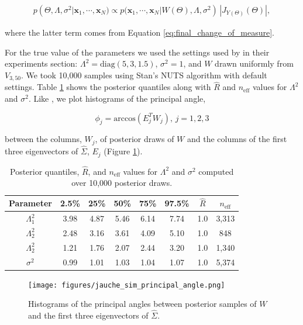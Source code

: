 \documentclass[ba]{imsart}
\newcommand{\mb}[1]{\mathbf{#1}}
\numberwithin{equation}{section}
\theoremstyle{plain}
\begin{document}
\begin{eqnarray}
\label{eq:ppca_density_givens}
p(\Theta, \Lambda, \sigma^2 | \mb{x}_1, \cdots, \mb{x}_N) \propto p(\mb{x}_1, \cdots, \mb{x}_N | W(\Theta), \Lambda, \sigma^2)\, |J_{Y(\Theta)}(\Theta)|,
\end{eqnarray}

\noindent where the latter term comes from Equation \ref{eq:final_change_of_measure}.

\noindent For the true value of the parameters we used the settings used by \citet{jauch2018random} in their experiments section: $\Lambda^2 = \mathrm{diag}(5, 3, 1.5)$, $\sigma^2 = 1$, and $W$ drawn uniformly from $V_{3, 50}$. We took 10,000 samples using Stan's NUTS algorithm with default settings. Table \ref{tab:ppca50} shows the posterior quantiles along with $\hat{R}$ and $n_{\mathrm{eff}}$ values for $\Lambda^2$ and $\sigma^2$. Like \citet{jauch2018random}, we plot histograms of the principal angle,

\begin{equation}
\phi_j = \mathrm{arccos}(E_j^T W_j),\, j=1,2,3
\end{equation}

\noindent between the columns, $W_j$, of posterior draws of $W$ and the columns of the first three eigenvectors of $\hat{\Sigma}$, $E_j$ (Figure \ref{fig:ppca50_principal_angle}).

\begin{table}
\begin{tabular}{|c||ccccccc|}
\hline
Parameter & 2.5\% & 25\% & 50\% & 75\% & 97.5\% &  $\hat{R}$ & $n_{\mathrm{eff}}$\\
\hline
\hline
$\Lambda_1^2$  & 3.98 & 4.87 & 5.46 & 6.14 & 7.74 & 1.0 & 3,313\\
$\Lambda_2^2$  & 2.48 & 3.16 & 3.61 & 4.09 & 5.10 & 1.0 & 848\\
$\Lambda_2^2$  & 1.21 & 1.76 & 2.07 & 2.44 & 3.20 & 1.0 & 1,340 \\
$\sigma^2$ & 0.99 & 1.01 & 1.03 & 1.04 & 1.07 & 1.0 & 5,374\\
\hline
\end{tabular}
\caption{Posterior quantiles, $\hat{R}$, and $n_{\mathrm{eff}}$ values for $\Lambda^2$ and $\sigma^2$ computed over 10,000 posterior draws.}
\label{tab:ppca50}
\end{table}

\begin{figure}[h]
\centering
\vspace{.1in}
\texttt{[image: figures/jauche\_sim\_principal\_angle.png]}
\vspace{.05in}
\caption{Histograms of the principal angles between posterior samples of $W$ and the first three eigenvectors of $\hat{\Sigma}$.}
\label{fig:ppca50_principal_angle}
\end{figure}
\end{document}
